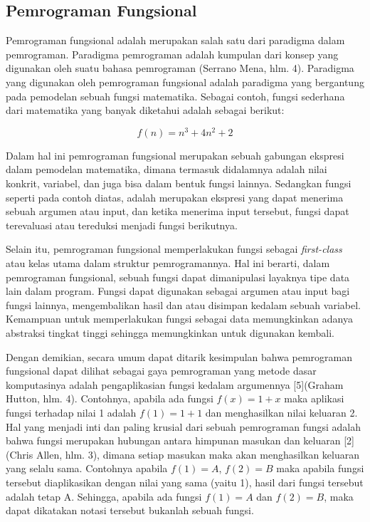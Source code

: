 \documentclass[pi.tex]{subfile}
\begin{document}
\subsection{Pemrograman Fungsional}
Pemrograman fungsional adalah merupakan salah satu dari paradigma dalam pemrograman. Paradigma pemrograman adalah kumpulan dari konsep yang digunakan oleh suatu bahasa pemrograman (Serrano Mena, hlm. 4). Paradigma yang digunakan oleh pemrograman fungsional adalah paradigma yang bergantung pada pemodelan sebuah fungsi matematika. Sebagai contoh, fungsi sederhana dari matematika yang banyak diketahui adalah sebagai berikut:

\begin{equation}
  f(n) = n^3 + 4n^2 + 2
\end{equation}

Dalam hal ini pemrograman fungsional merupakan sebuah gabungan ekspresi dalam pemodelan matematika, dimana termasuk didalamnya adalah nilai konkrit, variabel, dan juga bisa dalam bentuk fungsi lainnya. Sedangkan fungsi seperti pada contoh diatas, adalah merupakan ekspresi yang dapat menerima sebuah argumen atau input, dan ketika menerima input tersebut, fungsi dapat terevaluasi atau tereduksi menjadi fungsi berikutnya.

Selain itu, pemrograman fungsional memperlakukan fungsi sebagai \emph{first-class} atau kelas utama dalam struktur pemrogramannya. Hal ini berarti, dalam pemrograman fungsional, sebuah fungsi dapat dimanipulasi layaknya tipe data lain dalam program. Fungsi dapat digunakan sebagai argumen atau input bagi fungsi lainnya, mengembalikan hasil dan atau disimpan kedalam sebuah variabel. Kemampuan untuk memperlakukan fungsi sebagai data memungkinkan adanya abstraksi tingkat tinggi sehingga memungkinkan untuk digunakan kembali.

Dengan demikian, secara umum dapat ditarik kesimpulan bahwa pemrograman fungsional dapat dilihat sebagai gaya pemrograman yang metode dasar komputasinya adalah pengaplikasian fungsi kedalam argumennya [5](Graham Hutton, hlm. 4). Contohnya, apabila ada fungsi $f(x) = 1 + x$ maka aplikasi fungsi terhadap nilai 1 adalah $f(1) = 1 + 1$ dan menghasilkan nilai keluaran 2. Hal yang menjadi inti dan paling krusial dari sebuah pemrograman fungsi adalah bahwa fungsi merupakan hubungan antara himpunan masukan dan keluaran [2](Chris Allen, hlm. 3), dimana setiap masukan maka akan menghasilkan keluaran yang selalu sama. Contohnya apabila $f(1) = A$, $f(2) = B$ maka apabila fungsi tersebut diaplikasikan dengan nilai yang sama (yaitu 1), hasil dari fungsi tersebut adalah tetap A. Sehingga, apabila ada fungsi $f(1) = A$ dan $f(2) = B$, maka dapat dikatakan notasi tersebut bukanlah sebuah fungsi.
\end{document}
